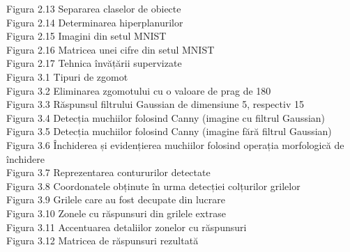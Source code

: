 \documentclass[a4paper,12pt]{report}
\begin{document}
Figura 2.13 \hspace{2mm} Separarea claselor de obiecte\\
Figura 2.14 \hspace{2mm} Determinarea hiperplanurilor\\
Figura 2.15 \hspace{2mm} Imagini din setul MNIST\\
Figura 2.16 \hspace{2mm} Matricea unei cifre din setul MNIST\\
Figura 2.17 \hspace{2mm} Tehnica învățării supervizate\\
Figura 3.1 \hspace{2mm} Tipuri de zgomot\\
Figura 3.2 \hspace{2mm} Eliminarea zgomotului cu o valoare de prag de 180\\
Figura 3.3 \hspace{2mm} Răspunsul filtrului Gaussian de dimensiune 5, respectiv 15\\
Figura 3.4 \hspace{2mm} Detecția muchiilor folosind Canny (imagine cu filtrul Gaussian)\\
Figura 3.5 \hspace{2mm} Detecția muchiilor folosind Canny (imagine fără filtrul Gaussian)\\
Figura 3.6 \hspace{2mm} Închiderea și evidențierea muchiilor folosind operația morfologică de închidere\\
Figura 3.7 \hspace{2mm} Reprezentarea contururilor detectate\\
Figura 3.8 \hspace{2mm} Coordonatele obținute în urma detecției colțurilor grilelor\\
Figura 3.9 \hspace{2mm} Grilele care au fost decupate din lucrare\\
Figura 3.10 \hspace{2mm} Zonele cu răspunsuri din grilele extrase\\
Figura 3.11 \hspace{2mm} Accentuarea detaliilor zonelor cu răspunsuri\\
Figura 3.12 \hspace{2mm} Matricea de răspunsuri rezultată\\
\end{document}
